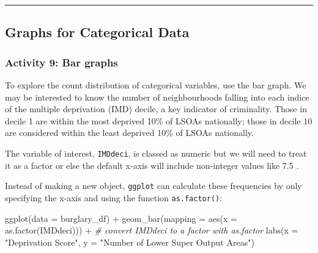 \documentclass[
]{book}
\newenvironment{Shaded}{\begin{snugshade}}{\end{snugshade}}
\newcommand{\AttributeTok}[1]{\textcolor[rgb]{0.77,0.63,0.00}{#1}}
\newcommand{\CommentTok}[1]{\textcolor[rgb]{0.56,0.35,0.01}{\textit{#1}}}
\newcommand{\FunctionTok}[1]{\textcolor[rgb]{0.00,0.00,0.00}{#1}}
\newcommand{\NormalTok}[1]{#1}
\newcommand{\SpecialCharTok}[1]{\textcolor[rgb]{0.00,0.00,0.00}{#1}}
\newcommand{\StringTok}[1]{\textcolor[rgb]{0.31,0.60,0.02}{#1}}
\begin{document}
\begin{center}\rule{0.5\linewidth}{0.5pt}\end{center}

\hypertarget{graphs-for-categorical-data}{%
\subsection{Graphs for Categorical Data}\label{graphs-for-categorical-data}}

\hypertarget{activity-9-bar-graphs}{%
\subsubsection{Activity 9: Bar graphs}\label{activity-9-bar-graphs}}

To explore the count distribution of categorical variables, use the bar graph. We may be interested to know the number of neighbourhoods falling into each indice of the multiple deprivation (IMD) decile, a key indicator of criminality. Those in decile 1 are within the most deprived 10\% of LSOAs nationally; those in decile 10 are considered within the least deprived 10\% of LSOAs nationally.

The variable of interest, \texttt{IMDdeci}, is classed as numeric but we will need to treat it as a factor or else the default x-axis will include non-integer values like 7.5 .

Instead of making a new object, \texttt{ggplot} can calculate these frequencies by only specifying the x-axis and using the function \texttt{as.factor()}:

\begin{Shaded}
\begin{Highlighting}[]
\FunctionTok{ggplot}\NormalTok{(}\AttributeTok{data =}\NormalTok{ burglary\_df) }\SpecialCharTok{+} 
  \FunctionTok{geom\_bar}\NormalTok{(}\AttributeTok{mapping =} \FunctionTok{aes}\NormalTok{(}\AttributeTok{x =} \FunctionTok{as.factor}\NormalTok{(IMDdeci))) }\SpecialCharTok{+} \CommentTok{\# convert IMDdeci to a factor with as.factor }
  \FunctionTok{labs}\NormalTok{(}\AttributeTok{x =} \StringTok{"Deprivation Score"}\NormalTok{, }\AttributeTok{y =} \StringTok{"Number of Lower Super Output Areas"}\NormalTok{)}
\end{Highlighting}
\end{Shaded}
\end{document}
